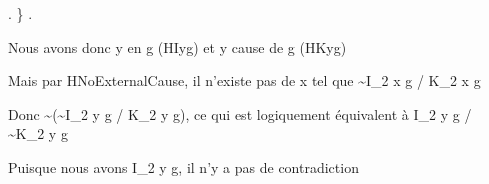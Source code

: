 \documentclass[10pt]{report}
\begin{document}
\begin{coqdoccode}
\coqdocindent{4.00em}
 .\coqdoceol
\coqdocindent{3.00em}
\}\coqdoceol
\coqdocindent{3.00em}
   .\coqdoceol
\coqdocemptyline
\coqdocindent{3.00em}
\begin{coqdoccomment}
\coqdocindent{0.50em}
Nous\coqdocindent{0.50em}
avons\coqdocindent{0.50em}
donc\coqdocindent{0.50em}
y\coqdocindent{0.50em}
en\coqdocindent{0.50em}
g\coqdocindent{0.50em}
(HIyg)\coqdocindent{0.50em}
et\coqdocindent{0.50em}
y\coqdocindent{0.50em}
cause\coqdocindent{0.50em}
de\coqdocindent{0.50em}
g\coqdocindent{0.50em}
(HKyg)\coqdocindent{0.50em}
\end{coqdoccomment}
\coqdoceol
\coqdocindent{3.00em}
\begin{coqdoccomment}
\coqdocindent{0.50em}
Mais\coqdocindent{0.50em}
par\coqdocindent{0.50em}
HNoExternalCause,\coqdocindent{0.50em}
il\coqdocindent{0.50em}
n'existe\coqdocindent{0.50em}
pas\coqdocindent{0.50em}
de\coqdocindent{0.50em}
x\coqdocindent{0.50em}
tel\coqdocindent{0.50em}
que\coqdocindent{0.50em}
\~{}I\_2\coqdocindent{0.50em}
x\coqdocindent{0.50em}
g\coqdocindent{0.50em}
/\coqdocindent{0.50em}
K\_2\coqdocindent{0.50em}
x\coqdocindent{0.50em}
g\coqdocindent{0.50em}
\end{coqdoccomment}
\coqdoceol
\coqdocindent{3.00em}
\begin{coqdoccomment}
\coqdocindent{0.50em}
Donc\coqdocindent{0.50em}
\~{}(\~{}I\_2\coqdocindent{0.50em}
y\coqdocindent{0.50em}
g\coqdocindent{0.50em}
/\coqdocindent{0.50em}
K\_2\coqdocindent{0.50em}
y\coqdocindent{0.50em}
g),\coqdocindent{0.50em}
ce\coqdocindent{0.50em}
qui\coqdocindent{0.50em}
est\coqdocindent{0.50em}
logiquement\coqdocindent{0.50em}
équivalent\coqdocindent{0.50em}
à\coqdocindent{0.50em}
I\_2\coqdocindent{0.50em}
y\coqdocindent{0.50em}
g\coqdocindent{0.50em}
/\coqdocindent{0.50em}
\~{}K\_2\coqdocindent{0.50em}
y\coqdocindent{0.50em}
g\coqdocindent{0.50em}
\end{coqdoccomment}
\coqdoceol
\coqdocindent{3.00em}
\begin{coqdoccomment}
\coqdocindent{0.50em}
Puisque\coqdocindent{0.50em}
nous\coqdocindent{0.50em}
avons\coqdocindent{0.50em}
I\_2\coqdocindent{0.50em}
y\coqdocindent{0.50em}
g,\coqdocindent{0.50em}
il\coqdocindent{0.50em}
n'y\coqdocindent{0.50em}
a\coqdocindent{0.50em}
pas\coqdocindent{0.50em}
de\coqdocindent{0.50em}
contradiction\coqdocindent{0.50em}
\end{coqdoccomment}
\coqdoceol
\coqdocindent{3.00em}
\begin{coqdoccomment}

\end{coqdoccomment}
\end{coqdoccode}
\end{document}
